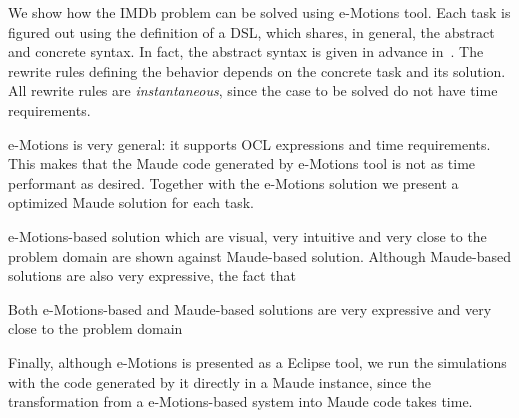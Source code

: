 

We show how the IMDb problem can be solved using e-Motions tool. Each task is figured out using the definition of a DSL, which shares, in general, the abstract and concrete syntax. In fact, the abstract syntax is given in advance in~\cite{imdbsources}. The rewrite rules defining the behavior depends on the concrete task and its solution. All rewrite rules are \textit{instantaneous}, since the case to be solved do not have time requirements.

e-Motions is very general: it supports OCL expressions and time requirements. This makes that the Maude code generated by e-Motions tool is not as time performant as desired. Together with the e-Motions solution we present a optimized Maude solution for each task. 



e-Motions-based solution which are visual, very intuitive and very close to the problem domain are shown against Maude-based solution. Although Maude-based solutions are also very expressive, the fact that  

Both e-Motions-based and Maude-based solutions are very expressive and very close to the problem domain

Finally, although e-Motions is presented as a Eclipse tool, we run the simulations with the code generated by it directly in a Maude instance, since the transformation from a e-Motions-based system into Maude code takes time.

